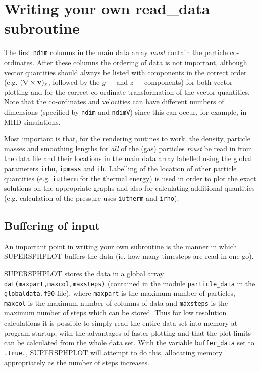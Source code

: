\documentclass[a4paper,12pt]{article}
\begin{document}
\newpage


\section{Writing your own read\_data subroutine}
\label{sec:writeyourown}
The first \verb+ndim+ columns in the main data array \emph{must} contain the particle co-ordinates.
After these columns the ordering of data is not important, although vector quantities should
always be listed with components in the correct order (e.g. $(\nabla\times {\bf v})_x$,
followed by the $y-$ and $z-$ components) for both vector plotting and for the
correct co-ordinate transformation of the vector quantities. Note that the co-ordinates and velocities can have different
numbers of dimensions (specified by \verb+ndim+ and \verb+ndimV+) since this can occur, for example, in MHD simulations.

Most important is that, for the rendering routines to work, the density, particle
masses and smoothing lengths for \emph{all} of the (gas) particles \emph{must} be read in from
the data file and their locations in the main data array labelled using the global
parameters \verb+irho+, \verb+ipmass+ and \verb+ih+. Labelling of the location of other particle
quantities (e.g. \verb+iutherm+ for the thermal energy) is used in
order to plot the exact solutions on the appropriate graphs and also for calculating
additional quantities (e.g. calculation of the pressure uses \verb+iutherm+ and
\verb+irho+).

\subsection{Buffering of input}
 An important point in writing your own subroutine is the manner in which
SUPERSPHPLOT buffers the data (ie. how many timesteps are read in one go).

SUPERSPHPLOT stores the data in a global array \verb+dat(maxpart,maxcol,maxsteps)+ (contained in
the module \verb+particle_data+ in the \verb+globaldata.f90+ file), where
\verb+maxpart+ is the maximum number of particles, \verb+maxcol+ is the maximum
number of columns of data and \verb+maxsteps+ is the maximum number of steps
which can be stored. Thus for low resolution calculations it is possible to
simply read the entire data set into memory at program startup, with the
advantages of faster plotting and that the plot limits can be calculated from the whole data set.
With the variable \verb+buffer_data+ set to \verb+.true.+, SUPERSPHPLOT
will attempt to do this, allocating memory appropriately as the number of steps
increases.
\end{document}
